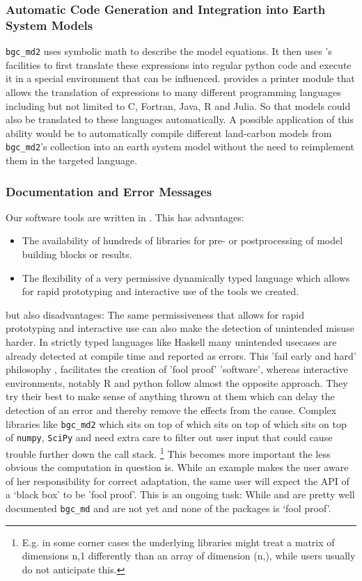 \subsubsection{Automatic Code Generation and Integration into Earth System Models}
\texttt{bgc\_md2} uses symbolic math to describe the model equations. It then
uses \sympy{}'s facilities to first translate these expressions into regular python code and execute it in a special environment that can be influenced.
\sympy{}
provides a printer module that allows the translation of \sympy{} 
expressions to many different programming languages including but not limited to C, Fortran, Java, R and Julia.
So that models could also be translated to these languages automatically. 
A possible application of this ability would be to automatically compile different land-carbon models from \texttt{bgc\_md2}'s collection into an earth system model without the need to reimplement them in the targeted language. 
\subsubsection{Documentation and Error Messages}
Our software tools are written in \python. 
This has advantages:
\begin{itemize}
  \item
  The availability of hundreds of libraries for pre-  or postprocessing of model building blocks or results.
  \item
  The flexibility of a very permissive dynamically typed language which allows for rapid prototyping and interactive use of the tools we created.
\end{itemize}
but also disadvantages: The same permissiveness that allows for rapid prototyping and interactive use can also make the detection of unintended misuse harder.
In strictly typed languages like Haskell many unintended usecases are already detected at compile time and reported as errors.
This 'fail early and hard' philosophy , facilitates the creation of 'fool proof'
'software', whereas interactive environments, notably  R and python follow
almost the opposite approach.  They try their best to make sense of anything
thrown at them which can delay the detection of an error and thereby remove the effects from the cause.
Complex libraries like \texttt{bgc\_md2} which sits on top of \CompartmentalSystems which sits on top of \LAPM which sits on top of \texttt{numpy}, \texttt{SciPy} and \sympy{}
need extra care to filter out user input that could cause trouble further down the call stack. 
\footnote{E.g. in some corner cases the underlying libraries might treat a matrix of dimensions n,1 differently than an array of dimension (n,), while users usually do not anticipate this.} This becomes more important the less obvious the computation in question is. 
While an example makes the user aware of her responsibility for correct adaptation, the same user will expect the API of a `black box' to be 'fool proof'. 
This is an ongoing task: While \LAPM and \CompartmentalSystems are pretty well documented 
\texttt{bgc\_md} and \ComputabilityGraphs are not yet and none of the packages is `fool proof'. 




